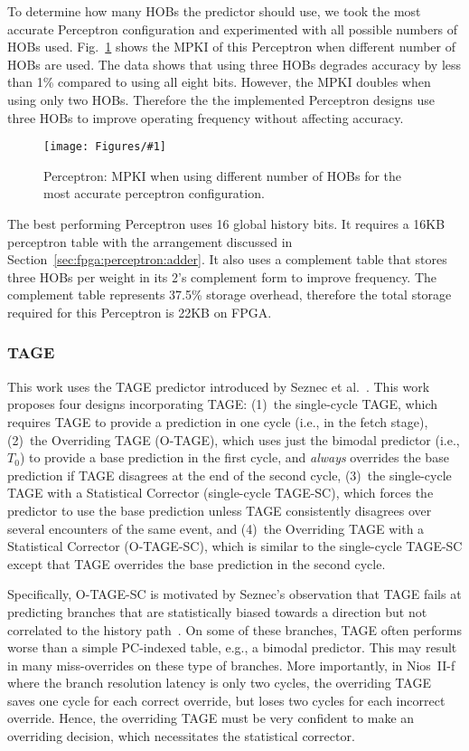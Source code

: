 \documentclass[conference]{IEEEtran}
\newcommand{\kfig}[4]{ %
        \begin{figure}[!t]
        \centering
        \texttt{[image: Figures/\#1]}
        \vspace{-1mm}
        \caption{#3}
        \label{#2}
        \end{figure}
}
\begin{document}
To determine how many HOBs the predictor should use, we took the most accurate Perceptron configuration and experimented with all possible numbers of HOBs used. Fig.~\ref{fig:perceptronHOB} shows the MPKI of this Perceptron when different number of HOBs are used. The data shows that using three HOBs degrades accuracy by less than 1\% compared to using all eight bits. However, the MPKI doubles when using only two HOBs. Therefore the the implemented Perceptron designs use three HOBs to improve operating frequency without affecting accuracy.
\kfig{perceptronHOB.pdf}{fig:perceptronHOB}{Perceptron: MPKI when using different number of HOBs for the most accurate perceptron configuration.}{angle = 0, trim = 1in 2.6in 1in 2.6in, clip, width=0.35\textwidth}

The best performing Perceptron uses 16 global history bits. It requires a 16KB perceptron table with the arrangement discussed in Section~\ref{sec:fpga:perceptron:adder}. It also uses a complement table that stores three HOBs per weight in its 2's complement form to improve frequency. The complement table represents 37.5\% storage overhead, therefore the total storage required for this Perceptron is 22KB on FPGA.

\subsubsection{TAGE}
\label{sec:eval:accuracy:tage}
This work uses the TAGE predictor introduced by Seznec et al.~\cite{tage}.  This work proposes four designs incorporating TAGE:  (1)~the single-cycle TAGE, which requires TAGE to provide a prediction in one cycle (i.e., in the fetch stage), (2)~the Overriding TAGE (\mbox{O-TAGE}), which uses just the bimodal predictor (i.e., $T_0$) to provide a base prediction in the first cycle, and \textit{always} overrides the base prediction if TAGE disagrees at the end of the second cycle, (3)~the single-cycle TAGE with a Statistical Corrector (single-cycle \mbox{TAGE-SC}), which forces the predictor to use the base prediction unless TAGE consistently disagrees over several encounters of the same event, and (4)~the Overriding TAGE with a Statistical Corrector (\mbox{O-TAGE-SC}), which is similar to the single-cycle \mbox{TAGE-SC} except that TAGE overrides the base prediction in the second cycle.

Specifically, \mbox{O-TAGE-SC} is motivated by Seznec's observation that TAGE fails at predicting branches that are statistically biased towards a direction but not correlated to the history path~\cite{isltage}. On some of these branches, TAGE often performs worse than a simple PC-indexed table, e.g., a bimodal predictor. This may result in many miss-overrides on these type of branches. More importantly, in Nios~II-f where the branch resolution latency is only two cycles, the overriding TAGE saves one cycle for each correct override, but loses two cycles for each incorrect override. 
Hence, the overriding TAGE must be very confident to make an overriding decision, which necessitates the statistical corrector.
\end{document}

